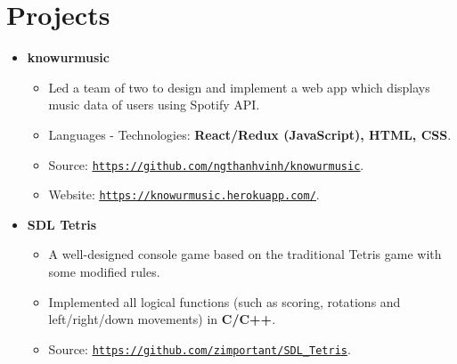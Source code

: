 \documentclass[letterpaper,11pt]{article}
\makeatletter
\newcommand{\resumeItem}[2]{
  \item\small{
    \textbf{#1}{#2 \vspace{-2pt}}
  }
}
\newcommand{\resumeSmallSubheading}[1]{
  \item
    \textbf{#1}\vspace{-5pt}
}
\newcommand{\resumePoint}[2]{
  \item
    \begin{tabular*}{0.97\textwidth}[t]{l@{\extracolsep{\fill}}r}
      #1 & \textbf{\small #2}
    \end{tabular*}
}
\newcommand{\resumeSubHeadingListStart}{\begin{itemize}[leftmargin=*]}
\newcommand{\resumeSubHeadingListEnd}{\end{itemize}}
\newcommand{\resumeItemListStart}{\begin{itemize}}
\newcommand{\resumeItemListEnd}{\end{itemize}\vspace{-5pt}}
\makeatother
\begin{document}
\section{Projects}
  \resumeSubHeadingListStart
    \resumeSmallSubheading{knowurmusic}
      \resumeItemListStart
        \resumeItem{}
          {Led a team of two to design and implement a web app which displays music data of users using Spotify API.}
        \resumeItem{}
          {Languages - Technologies: \textbf{React/Redux (JavaScript), HTML, CSS}.}
        \resumeItem{}
          {Source: \href{https://github.com/ngthanhvinh/knowurmusic}{\underline{\texttt{https://github.com/ngthanhvinh/knowurmusic}}}.}
        \resumeItem{}
          {Website: \href{https://knowurmusic.herokuapp.com/}{\underline{\texttt{https://knowurmusic.herokuapp.com/}}}.}
      \resumeItemListEnd


    \resumeSmallSubheading{SDL Tetris}
    \resumeItemListStart
      \resumeItem{}
        {A well-designed console game based on the traditional Tetris game with some modified rules.}
      \resumeItem{}
        {Implemented all logical functions (such as scoring, rotations and left/right/down movements) in \textbf{C/C++}.}
      \resumeItem{}
      {Source: \href{https://github.com/zimportant/SDL_Tetris}{\underline{\texttt{https://github.com/zimportant/SDL\_Tetris}}}.}
    \resumeItemListEnd


  \resumeSubHeadingListEnd




\end{document}
